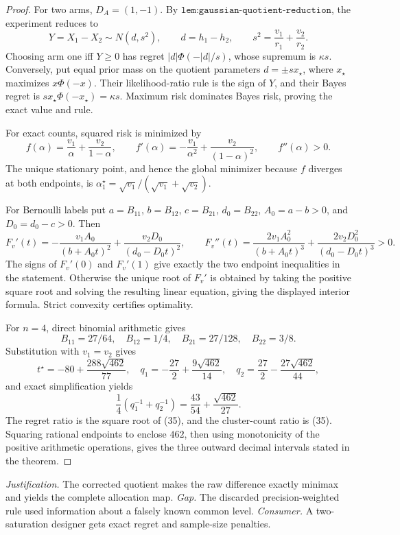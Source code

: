 \documentclass{article}
\begin{document}
\begin{proof}
For two arms, \(D_A=(1,-1)\).  By \(\texttt{lem:gaussian-quotient-reduction}\), the experiment reduces to
\[
 Y=X_1-X_2\sim N(d,s^2),\qquad d=h_1-h_2,\qquad
 s^2=\frac{v_1}{r_1}+\frac{v_2}{r_2}. \tag{33}
\]
Choosing arm one iff \(Y\geq0\) has regret \(|d|\Phi(-|d|/s)\), whose supremum is \(\kappa s\).  Conversely, put equal prior mass on the quotient parameters \(d=\pm sx_\star\), where \(x_\star\) maximizes \(x\Phi(-x)\).  Their likelihood-ratio rule is the sign of \(Y\), and their Bayes regret is \(sx_\star\Phi(-x_\star)=\kappa s\).  Maximum risk dominates Bayes risk, proving the exact value and rule.

For exact counts, squared risk is minimized by
\[
 f(\alpha)=\frac{v_1}{\alpha}+\frac{v_2}{1-\alpha},\qquad
 f'(\alpha)=-\frac{v_1}{\alpha^2}+\frac{v_2}{(1-\alpha)^2},\qquad
 f''(\alpha)>0.
\]
The unique stationary point, and hence the global minimizer because \(f\) diverges at both endpoints, is
\(\alpha_1^\star=\sqrt{v_1}/(\sqrt{v_1}+\sqrt{v_2})\).

For Bernoulli labels put \(a=B_{11}\), \(b=B_{12}\), \(c=B_{21}\), \(d_0=B_{22}\), \(A_0=a-b>0\), and \(D_0=d_0-c>0\).  Then
\[
F_v'(t)=-\frac{v_1A_0}{(b+A_0t)^2}+\frac{v_2D_0}{(d_0-D_0t)^2},\qquad
F_v''(t)=\frac{2v_1A_0^2}{(b+A_0t)^3}+\frac{2v_2D_0^2}{(d_0-D_0t)^3}>0. \tag{34}
\]
The signs of \(F_v'(0)\) and \(F_v'(1)\) give exactly the two endpoint inequalities in the statement.  Otherwise the unique root of \(F_v'\) is obtained by taking the positive square root and solving the resulting linear equation, giving the displayed interior formula.  Strict convexity certifies optimality.

For \(n=4\), direct binomial arithmetic gives
\[
B_{11}=27/64,\quad B_{12}=1/4,\quad B_{21}=27/128,\quad B_{22}=3/8.
\]
Substitution with \(v_1=v_2\) gives
\[
t^\star=-80+\frac{288\sqrt{462}}{77},\quad
q_1=-\frac{27}{2}+\frac{9\sqrt{462}}{14},\quad
q_2=\frac{27}{2}-\frac{27\sqrt{462}}{44},
\]
and exact simplification yields
\[
\frac14(q_1^{-1}+q_2^{-1})=\frac{43}{54}+\frac{\sqrt{462}}{27}. \tag{35}
\]
The regret ratio is the square root of (35), and the cluster-count ratio is (35).  Squaring rational endpoints to enclose \(462\), then using monotonicity of the positive arithmetic operations, gives the three outward decimal intervals stated in the theorem.
\end{proof}
\par\smallskip\noindent \textit{Justification.} The corrected quotient makes the raw difference exactly minimax and yields the complete allocation map. \textit{Gap.} The discarded precision-weighted rule used information about a falsely known common level. \textit{Consumer.} A two-saturation designer gets exact regret and sample-size penalties.
\end{document}
